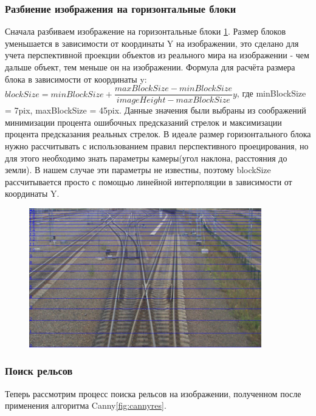 \subsubsection{Разбиение изображения на горизонтальные блоки}
Сначала разбиваем изображение на горизонтальные блоки \ref{fig:horizontal_blocks}. Размер блоков уменьшается в зависимости от координаты Y на изображении, это сделано для учета перспективной проекции объектов из реального мира на изображении - чем дальше объект, тем меньше он на изображении.
\newline
Формула для расчёта размера блока в зависимости от координаты y:
\newline
$blockSize = minBlockSize + \dfrac{maxBlockSize - minBlockSize}{imageHeight - maxBlockSize}y$, где  minBlockSize = 7pix, maxBlockSize = 45pix. Данные значения были выбраны из соображений минимизации процента ошибочных предсказаний стрелок и максимизации процента предсказания реальных стрелок.
В идеале размер горизонтального блока нужно рассчитывать с использованием правил перспективного проецирования\cite{b:projection}, но для этого необходимо знать параметры камеры(угол наклона, расстояния до земли).
В нашем случае эти параметры не известны, поэтому blockSize рассчитывается просто с помощью линейной интерполяции в зависимости от координаты Y.
 
\begin{figure}[!h]
	\centering
	\includegraphics[width=0.9\textwidth]{pictures/horizontal_blocks.png}
	\caption[Разбиение на горизонтальные блоки]{}
	\label{fig:horizontal_blocks}
\end{figure}
\newpage
\subsubsection{Поиск рельсов}
Теперь рассмотрим процесс поиска рельсов на изображении, полученном после применения алгоритма Canny\ref{fig:cannyres}.

